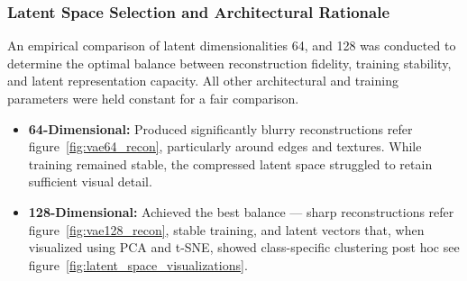 \subsubsection{Latent Space Selection and Architectural Rationale} \label{sec:latent-space-selection}

An empirical comparison of latent dimensionalities 64, and 128 was conducted to determine the optimal balance between reconstruction fidelity, training stability, and latent representation capacity. All other architectural and training parameters were held constant for a fair comparison.
\begin{itemize}
    \item \textbf{64-Dimensional:} Produced significantly blurry reconstructions refer figure~\ref{fig:vae64_recon}, particularly around edges and textures. While training remained stable, the compressed latent space struggled to retain sufficient visual detail.
    
    \item \textbf{128-Dimensional:} Achieved the best balance — sharp reconstructions refer figure~\ref{fig:vae128_recon}, stable training, and latent vectors that, when visualized using PCA and t-SNE, showed class-specific clustering post hoc see figure~\ref{fig:latent_space_visualizations}.
\end{itemize}

